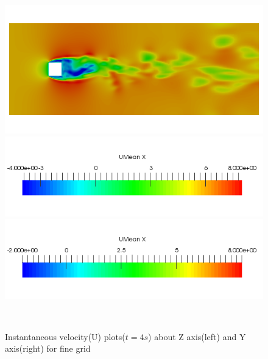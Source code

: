 \begin{figure}[H]
\begin{minipage}[b]{0.5\linewidth}
\end{minipage}
\begin{minipage}[b]{0.5\linewidth}
\includegraphics[scale=0.25]{figure/fine/one/Umag_y.png}
\caption*{}
\end{minipage}
\begin{minipage}[b]{0.5\linewidth}
\includegraphics[scale=0.35]{figure/z_scale.png}
\end{minipage}
\begin{minipage}[b]{0.5\linewidth}
\includegraphics[scale=0.35]{figure/y_scale.png}
\end{minipage}\\
\caption{Instantaneous velocity(U) plots($t=4s$) about Z axis(left) and Y axis(right) for fine grid}
\label{fig:44}
\end{figure}



